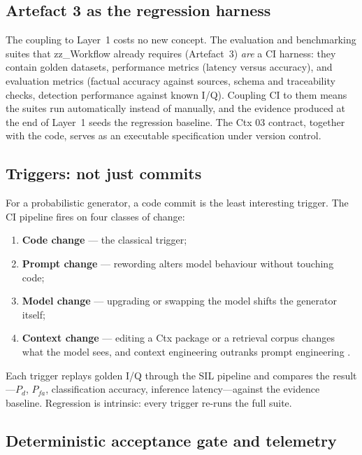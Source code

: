 \documentclass[11pt,a4paper]{article}
\begin{document}
\subsection{Artefact 3 as the regression harness}
\label{sec:artefact3}

The coupling to Layer~1 costs no new concept. The evaluation and benchmarking suites that
zz\_Workflow already requires (Artefact~3) \emph{are} a CI harness: they contain golden datasets,
performance metrics (latency versus accuracy), and evaluation metrics (factual accuracy against
sources, schema and traceability checks, detection performance against known I/Q). Coupling CI
to them means the suites run automatically instead of manually, and the evidence produced at the
end of Layer~1 seeds the regression baseline. The Ctx 03 contract, together with the code, serves
as an executable specification under version control.

\subsection{Triggers: not just commits}
\label{sec:triggers}

For a probabilistic generator, a code commit is the least interesting trigger. The CI pipeline
fires on four classes of change:

\begin{enumerate}
  \item \textbf{Code change} --- the classical trigger;
  \item \textbf{Prompt change} --- rewording alters model behaviour without touching code;
  \item \textbf{Model change} --- upgrading or swapping the model shifts the generator itself;
  \item \textbf{Context change} --- editing a Ctx package or a retrieval corpus changes what the
    model sees, and context engineering outranks prompt engineering \cite{anthropic2026}.
\end{enumerate}

Each trigger replays golden I/Q through the SIL pipeline and compares the result---$P_d$,
$P_{fa}$, classification accuracy, inference latency---against the evidence baseline. Regression
is intrinsic: every trigger re-runs the full suite.

\subsection{Deterministic acceptance gate and telemetry}
\label{sec:gate}
\end{document}
